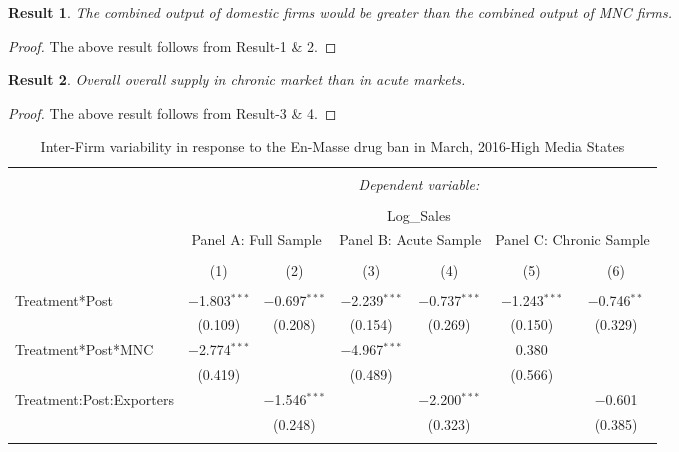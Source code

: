 \documentclass[AER]{AEA}
\theoremstyle{theorem}
\newtheorem{res}{Result}
\begin{document}
\begin{res}
	The combined output of domestic firms would be greater than the combined output of MNC firms.
\end{res}

\begin{proof}
The above result follows from Result-1 \& 2.
\end{proof}


\begin{res}
	Overall overall supply in chronic market than in acute markets.
\end{res}

\begin{proof}
	The above result follows from Result-3 \& 4.
\end{proof}

\begin{table}[h!] \centering
	\caption{Inter-Firm variability in response to the En-Masse drug ban in March, 2016-High Media States} 
	\label{Table-R-3} 
	\footnotesize
\begin{tabular}{@{\extracolsep{1pt}}lcccccc} 
	\\[-1.8ex]\hline 
	\hline \\[-1.8ex] 
	& \multicolumn{6}{c}{\textit{Dependent variable:}} \\ 
	\cline{2-7} 
	\\[-1.8ex] & \multicolumn{6}{c}{Log\_Sales} \\ 
	& \multicolumn{2}{c}{Panel A: Full Sample} & \multicolumn{2}{c}{Panel B: Acute Sample} & \multicolumn{2}{c}{Panel C: Chronic Sample} \\ 
	\\[-1.8ex] & (1) & (2) & (3) & (4) & (5) & (6)\\ 
	\hline \\[-1.8ex] 
	Treatment*Post & $-$1.803$^{***}$ & $-$0.697$^{***}$ & $-$2.239$^{***}$ & $-$0.737$^{***}$ & $-$1.243$^{***}$ & $-$0.746$^{**}$ \\ 
	& (0.109) & (0.208) & (0.154) & (0.269) & (0.150) & (0.329) \\ 
	Treatment*Post*MNC & $-$2.774$^{***}$ &  & $-$4.967$^{***}$ &  & 0.380 &  \\ 
	& (0.419) &  & (0.489) &  & (0.566) &  \\ 
	Treatment:Post:Exporters &  & $-$1.546$^{***}$ &  & $-$2.200$^{***}$ &  & $-$0.601 \\ 
	&  & (0.248) &  & (0.323) &  & (0.385) \\ 
	\hline \\[-1.8ex] 

\end{tabular}
\end{table}
\end{document}
